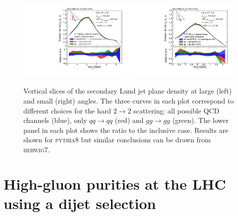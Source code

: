 \documentclass[a4paper,11pt]{article}
\newcommand{\py}{{\textsc{pythia}}8\xspace}
\newcommand{\hw}{{\textsc{herwig}}7\xspace}
\begin{document}
\begin{figure}
    \centering
    \includegraphics[width = 0.49\textwidth]{Figure3a.pdf}
    \includegraphics[width = 0.49\textwidth]{Figure3b.pdf}
    \caption{Vertical slices of the secondary Lund jet plane density at large (left) and small (right) angles. The three curves in each plot correspond to different choices for the hard $2\to 2$ scattering: all possible QCD channels (blue), only $qq\to qq$ (red) and $gg \to gg$ (green). The lower panel in each plot shows the ratio to the inclusive case. Results are shown for \py but similar conclusions can be drawn from \hw.}
    \label{fig:universality}
\end{figure}

\section{High-gluon purities at the LHC using a dijet selection}
\label{sec:MCs}
\end{document}
